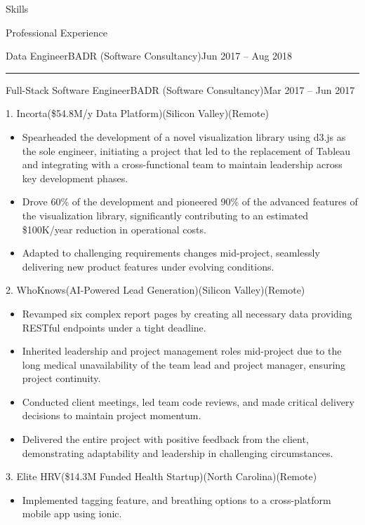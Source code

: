 \documentclass[]{ahmedamrcv}
\begin{document}
\begin{cvsection}{Skills}
\begin{cvsection}{Professional Experience}
\begin{cvsubsection}{Data Engineer}{BADR (Software Consultancy)}{Jun 2017 -- Aug 2018}
            \end{cvsubsection}
            \centering\rule{300pt}{0.4pt}
            \begin{cvsubsection}{Full-Stack Software Engineer}{BADR (Software Consultancy)}{Mar 2017 -- Jun 2017}
            \begin{cvsubsection}{1. Incorta}{(\$54.8M/y Data Platform)}{(Silicon Valley)(Remote)}
			\begin{itemize}
				\item Spearheaded the development of a novel visualization library using d3.js as the sole engineer, initiating a project that led to the replacement of Tableau and integrating with a cross-functional team to maintain leadership across key development phases.
                    \item Drove 60\% of the development and pioneered 90\% of the advanced features of the visualization library, significantly contributing to an estimated \$100K/year reduction in operational costs.
                    \item Adapted to challenging requirements changes mid-project, seamlessly delivering new product features under evolving conditions.
			\end{itemize}
		\end{cvsubsection}
            \begin{cvsubsection}{2. WhoKnows}{(AI-Powered Lead Generation)}{(Silicon Valley)(Remote)}
			\begin{itemize}
				\item Revamped six complex report pages by creating all necessary data providing RESTful endpoints under a tight deadline.
                    \item Inherited leadership and project management roles mid-project due to the long medical unavailability of the team lead and project manager, ensuring project continuity.
                    \item Conducted client meetings, led team code reviews, and made critical delivery decisions to maintain project momentum.
                    \item Delivered the entire project with positive feedback from the client, demonstrating adaptability and leadership in challenging circumstances.
			\end{itemize}
		\end{cvsubsection}
            \begin{cvsubsection}{3. Elite HRV}{(\$14.3M Funded Health Startup)}{(North Carolina)(Remote)}
			\begin{itemize}
				\item Implemented tagging feature, and breathing options to a cross-platform mobile app using ionic.
			\end{itemize}
		\end{cvsubsection}
            \end{cvsubsection}
            

\end{cvsection}
\end{cvsection}
\end{document}
